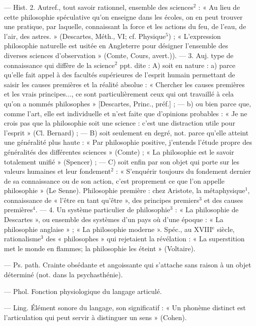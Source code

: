 \begin{itemize}[leftmargin=1cm, label=, itemsep=1pt]
— Hist. 2. Autref., tout savoir
rationnel, ensemble des sciences$^2$ :
« Au lieu de cette philosophie spéculative qu’on enseigne dans les écoles,
on en peut trouver une pratique,
par laquelle, connaissant la force et
les actions du feu, de l’eau, de l'air,
des astres. » (Descartes, Méth., VI;
cf. Physique$^5$) ; « L'expression philosophie naturelle est usitée en Angleterre pour désigner l’ensemble des
diverses sciences d'observation »
(Comte, Cours, avert.)). — 3. Auj.
type de connaissance qui diffère de
la science$^2$ ppt. dite : A) soit en
nature : a) parce qu’elle fait appel à
des facultés supérieures de l’esprit
humain permettant de saisir les
causes premières et la réalité absolue : « Chercher les causes premières
et les vrais principes..., ce sont particulièrement ceux qui ont travaillé
à cela qu’on a nommés philosophes »
[Descartes, Princ., préf.] ; — b) ou
bien parce que, comme l’art, elle est
individuelle et n’est faite que d'opinions probables : « Je ne crois pas
que la philosophie soit une science :
c’est une distraction utile pour
l'esprit » (Cl. Bernard) ; — B) soit
seulement en degré, not. parce qu’elle
atteint une généralité plus haute :
« Par philosophie positive, j'entends
l’étude propre des généralités des
différentes sciences » (Comte) ; « La
philosophie est le savoir totalement
unifié » (Spencer) ; — C) soit enfin
par son objet qui porte sur les valeurs
humaines et leur fondement$^2$ : « S’enquérir toujours du fondement dernier de sa connaissance ou de son
action, c’est proprement ce que l’on
appelle philosophie » (Le Senne).
Philosophie première : chez Aristote,
la métaphysique$^1$, connaissance de
« l'être en tant qu'être », des principes premiers$^3$ et des causes premières$^4$. — 4. Un système particulier de philosophie$^3$ : « La philosophie de Descartes », ou ensemble des
systèmes d'un pays où d’une époque : « La philosophie anglaise » ;
« La philosophie moderne ». Spéc.,
au {\footnotesize XVIII}$^\text{e}$ siècle, rationalisme$^3$ des
« philosophes » qui rejetaient la
révélation : « La superstition met le
monde en flammes; la philosophie
les éteint » (Voltaire).

 — Ps. path. Crainte obsédante
et angoissante qui s'attache sans
raison à un objet déterminé (not.
dans la psychasthénie).

 — Phol. Fonction physiologique du langage articulé.

 — Ling. Élément sonore du
langage, son significatif : « Un phonème distinct est l'articulation qui
peut servir à distinguer un sens »
(Cohen).


\end{itemize}
